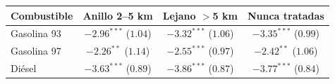 \begin{tabular}{lccc}
\toprule
Combustible & Anillo 2--5 km & Lejano $>$5 km & Nunca tratadas \\
\midrule
Gasolina 93 & $-2.96^{***}$ ($1.04$) & $-3.32^{***}$ ($1.06$) & $-3.35^{***}$ ($0.99$) \\
Gasolina 97 & $-2.26^{**}$ ($1.14$) & $-2.55^{***}$ ($0.97$) & $-2.42^{**}$ ($1.06$) \\
Diésel & $-3.63^{***}$ ($0.89$) & $-3.86^{***}$ ($0.87$) & $-3.77^{***}$ ($0.84$) \\
\bottomrule
\end{tabular}

